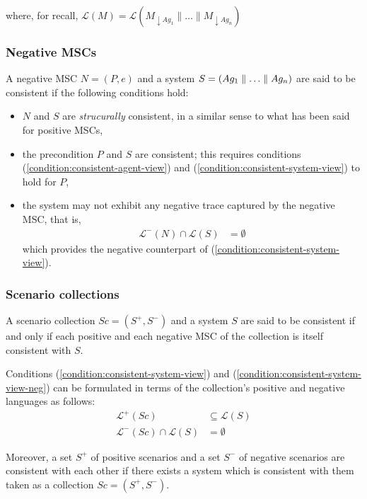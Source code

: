 \noindent where, for recall, $\mathcal{L}(M) = \mathcal{L}(M_{\downarrow Ag_1} \parallel \ldots \parallel M_{\downarrow Ag_n})$

\subsubsection*{Negative MSCs}

A negative MSC $N = (P,e)$ and a system $S = (Ag_1 \parallel \ldots \parallel Ag_n)$ are said to be consistent if the following conditions hold:

\begin{itemize}
\item $N$ and $S$ are \emph{strucurally} consistent, in a similar sense to what has been said for positive MSCs,

\item the precondition $P$ and $S$ are consistent; this requires conditions (\ref{condition:consistent-agent-view}) and (\ref{condition:consistent-system-view}) to hold for $P$,

\item the system may not exhibit any negative trace captured by the negative MSC, that is,
\begin{align}\mathcal{L}^{-}(N) \cap \mathcal{L}(S) &= \emptyset\label{condition:consistent-system-view-neg}\end{align}
\noindent which provides the negative counterpart of (\ref{condition:consistent-system-view}).
\end{itemize}

\subsubsection*{Scenario collections}

A scenario collection $Sc = (S^+,S^-)$ and a system $S$ are said to be consistent if and only if each positive and each negative MSC of the collection is itself consistent with $S$. 

Conditions (\ref{condition:consistent-system-view}) and (\ref{condition:consistent-system-view-neg}) can be formulated in terms of the collection's positive and negative languages as follows:
\begin{align}
\mathcal{L}^+(Sc) & \subseteq \mathcal{L}(S) \\
\mathcal{L}^-(Sc) \cap \mathcal{L}(S) &= \emptyset
\end{align}

Moreover, a set $S^+$ of positive scenarios and a set $S^-$ of negative scenarios are consistent with each other if there exists a system which is consistent with them taken as a collection $Sc = (S^+,S^-)$. 

